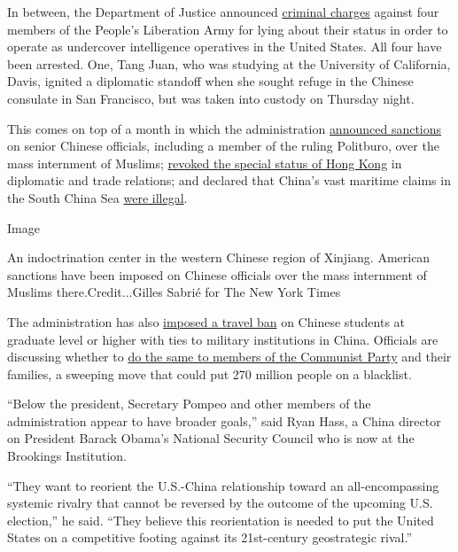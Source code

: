 In between, the Department of Justice announced
\href{https://www.justice.gov/opa/pr/researchers-charged-visa-fraud-after-lying-about-their-work-china-s-people-s-liberation-army}{criminal
charges} against four members of the People's Liberation Army for lying
about their status in order to operate as undercover intelligence
operatives in the United States. All four have been arrested. One, Tang
Juan, who was studying at the University of California, Davis, ignited a
diplomatic standoff when she sought refuge in the Chinese consulate in
San Francisco, but was taken into custody on Thursday night.

This comes on top of a month in which the administration
\href{https://www.nytimes3xbfgragh.onion/2020/07/09/world/asia/trump-china-sanctions-uighurs.html}{announced
sanctions} on senior Chinese officials, including a member of the ruling
Politburo, over the mass internment of Muslims;
\href{https://www.nytimes3xbfgragh.onion/2020/07/15/world/asia/china-trump-hong-kong.html}{revoked
the special status of Hong Kong} in diplomatic and trade relations; and
declared that China's vast maritime claims in the South China Sea
\href{https://www.nytimes3xbfgragh.onion/2020/07/13/world/asia/south-china-sea-pompeo.html}{were
illegal}.

Image

An indoctrination center in the western Chinese region of Xinjiang.
American sanctions have been imposed on Chinese officials over the mass
internment of Muslims there.Credit...Gilles Sabrié for The New York
Times

The administration has also
\href{https://www.nytimes3xbfgragh.onion/2020/05/28/us/politics/china-hong-kong-trump-student-visas.html}{imposed
a travel ban} on Chinese students at graduate level or higher with ties
to military institutions in China. Officials are discussing whether to
\href{https://www.nytimes3xbfgragh.onion/2020/07/15/us/politics/china-travel-ban.html}{do
the same to members of the Communist Party} and their families, a
sweeping move that could put 270 million people on a blacklist.

``Below the president, Secretary Pompeo and other members of the
administration appear to have broader goals,'' said Ryan Hass, a China
director on President Barack Obama's National Security Council who is
now at the Brookings Institution.

``They want to reorient the U.S.-China relationship toward an
all-encompassing systemic rivalry that cannot be reversed by the outcome
of the upcoming U.S. election,'' he said. ``They believe this
reorientation is needed to put the United States on a competitive
footing against its 21st-century geostrategic rival.''

